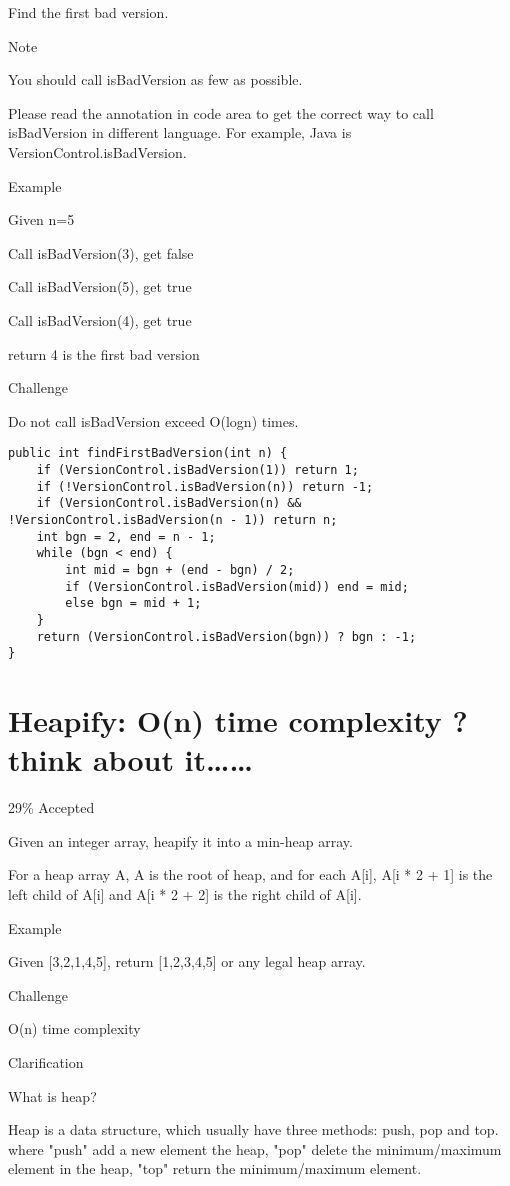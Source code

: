 \documentclass[9pt, b5paaper]{book}
\begin{document}
Find the first bad version.

Note

You should call isBadVersion as few as possible. 

Please read the annotation in code area to get the correct way to call isBadVersion in different language. For example, Java is VersionControl.isBadVersion.

Example

Given n=5

Call isBadVersion(3), get false

Call isBadVersion(5), get true

Call isBadVersion(4), get true

return 4 is the first bad version

Challenge

Do not call isBadVersion exceed O(logn) times.
\begin{verbatim}
public int findFirstBadVersion(int n) {
    if (VersionControl.isBadVersion(1)) return 1;
    if (!VersionControl.isBadVersion(n)) return -1;
    if (VersionControl.isBadVersion(n) && !VersionControl.isBadVersion(n - 1)) return n;
    int bgn = 2, end = n - 1;
    while (bgn < end) {
        int mid = bgn + (end - bgn) / 2;
        if (VersionControl.isBadVersion(mid)) end = mid;
        else bgn = mid + 1;
    }
    return (VersionControl.isBadVersion(bgn)) ? bgn : -1;
}
\end{verbatim}
\section{Heapify: O(n) time complexity ? think about it\ldots{}\ldots{}}
\label{sec-5-32}

29\% Accepted

Given an integer array, heapify it into a min-heap array.

For a heap array A, A\footnotemark[1]{} is the root of heap, and for each A[i], A[i * 2 + 1] is the left child of A[i] and A[i * 2 + 2] is the right child of A[i].

Example

Given [3,2,1,4,5], return [1,2,3,4,5] or any legal heap array.

Challenge

O(n) time complexity

Clarification

What is heap?

Heap is a data structure, which usually have three methods: push, pop and top. where "push" add a new element the heap, "pop" delete the minimum/maximum element in the heap, "top" return the minimum/maximum element.
\end{document}
